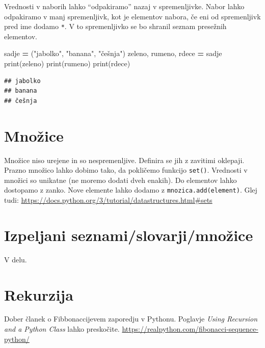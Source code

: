 \documentclass[
]{report}
\newenvironment{Shaded}{\begin{snugshade}}{\end{snugshade}}
\newcommand{\BuiltInTok}[1]{#1}
\newcommand{\NormalTok}[1]{#1}
\newcommand{\OperatorTok}[1]{\textcolor[rgb]{0.81,0.36,0.00}{\textbf{#1}}}
\newcommand{\StringTok}[1]{\textcolor[rgb]{0.31,0.60,0.02}{#1}}
\begin{document}
Vrednosti v naborih lahko ``odpakiramo'' nazaj v spremenljivke. Nabor lahko odpakiramo v manj spremenljivk, kot je elementov nabora, če eni od spremenljivk pred ime dodamo \texttt{*}. V to spremenljivko se bo shranil seznam presežnih elementov.

\begin{Shaded}
\begin{Highlighting}[]
\NormalTok{sadje }\OperatorTok{=}\NormalTok{ (}\StringTok{"jabolko"}\NormalTok{, }\StringTok{"banana"}\NormalTok{, }\StringTok{"češnja"}\NormalTok{)}
\NormalTok{zeleno, rumeno, rdece }\OperatorTok{=}\NormalTok{ sadje}
\BuiltInTok{print}\NormalTok{(zeleno)}
\BuiltInTok{print}\NormalTok{(rumeno)}
\BuiltInTok{print}\NormalTok{(rdece)}
\end{Highlighting}
\end{Shaded}

\begin{verbatim}
## jabolko
## banana
## češnja
\end{verbatim}

\hypertarget{mnoux17eice}{%
\section{Množice}\label{mnoux17eice}}

Množice niso urejene in so nespremenljive. Definira se jih z zavitimi oklepaji. Prazno množico lahko dobimo tako, da pokličemo funkcijo \texttt{set()}. Vrednosti v množici so unikatne (ne moremo dodati dveh enakih). Do elementov lahko dostopamo z zanko. Nove elemente lahko dodamo z \texttt{mnozica.add(element)}. Glej tudi: \url{https://docs.python.org/3/tutorial/datastructures.html\#sets}

\hypertarget{izpeljani-seznamislovarjimnoux17eice}{%
\section{Izpeljani seznami/slovarji/množice}\label{izpeljani-seznamislovarjimnoux17eice}}

V delu.

\hypertarget{rekurzija}{%
\section{Rekurzija}\label{rekurzija}}

Dober članek o Fibbonaccijevem zaporedju v Pythonu. Poglavje \emph{Using Recursion and a Python Class} lahko preskočite.
\url{https://realpython.com/fibonacci-sequence-python/}
\end{document}
